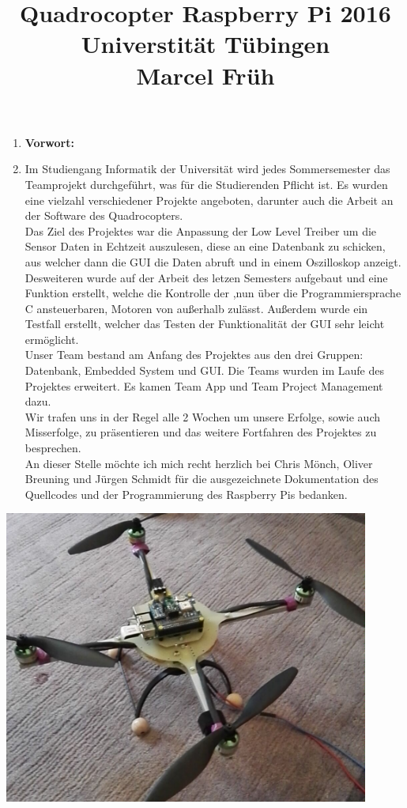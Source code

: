 \documentclass{article}
\title{Quadrocopter Raspberry Pi 2016\\Universtität Tübingen\\Marcel Früh}
\begin{document}
\maketitle
\begin{enumerate}
\item[] \textbf{Vorwort:}

\item[] Im Studiengang Informatik der Universität wird jedes Sommersemester das Teamprojekt durchgeführt, was für die Studierenden Pflicht ist. Es wurden eine vielzahl verschiedener Projekte angeboten, darunter auch die Arbeit an der Software des Quadrocopters.\\
Das Ziel des Projektes war die Anpassung der Low Level Treiber um die Sensor Daten in Echtzeit auszulesen, diese an eine Datenbank zu schicken, aus welcher dann die GUI die Daten abruft und in einem Oszilloskop anzeigt. Desweiteren wurde auf der Arbeit des letzen Semesters aufgebaut und eine Funktion erstellt, welche die Kontrolle der ,nun über die Programmiersprache C ansteuerbaren, Motoren von außerhalb zulässt. Außerdem wurde ein Testfall erstellt, welcher das Testen der Funktionalität der GUI sehr leicht ermöglicht.\\

Unser Team bestand am Anfang des Projektes aus den drei Gruppen: Datenbank, Embedded System und GUI. Die Teams wurden im Laufe des Projektes erweitert. Es kamen Team App und Team Project Management dazu.\\
Wir trafen uns in der Regel alle 2 Wochen um unsere Erfolge, sowie auch Misserfolge, zu präsentieren und das weitere Fortfahren des Projektes zu besprechen.\\

An dieser Stelle möchte ich mich recht herzlich bei Chris Mönch, Oliver Breuning und Jürgen Schmidt für die ausgezeichnete Dokumentation des Quellcodes und der Programmierung des Raspberry Pis bedanken.
\end{enumerate}

\newpage

\tableofcontents

\vspace{2cm}
\begin{center} 
\includegraphics[width=0.9\textwidth]{graphics/signal.jpeg}
\end{center}
\end{document}

